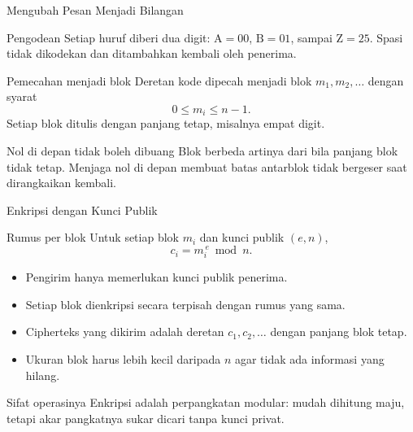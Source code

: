 \documentclass[aspectratio=169,11pt]{beamer}
\begin{document}
\begin{frame}{Mengubah Pesan Menjadi Bilangan}
    \footnotesize
    \begin{block}{Pengodean}
        Setiap huruf diberi dua digit: $\text{A}=00$, $\text{B}=01$, sampai
        $\text{Z}=25$. Spasi tidak dikodekan dan ditambahkan kembali oleh
        penerima.
    \end{block}
    \begin{block}{Pemecahan menjadi blok}
        Deretan kode dipecah menjadi blok $m_1, m_2, \dots$ dengan syarat
        \[
            0 \le m_i \le n-1 .
        \]
        Setiap blok ditulis dengan panjang tetap, misalnya empat digit.
    \end{block}
    \begin{alertblock}{Nol di depan tidak boleh dibuang}
        \footnotesize
        Blok  berbeda artinya dari  bila panjang blok
        tidak tetap. Menjaga nol di depan membuat batas antarblok tidak
        bergeser saat dirangkaikan kembali.
    \end{alertblock}
\end{frame}

\begin{frame}{Enkripsi dengan Kunci Publik}
    \footnotesize
    \begin{block}{Rumus per blok}
        Untuk setiap blok $m_i$ dan kunci publik $(e,n)$,
        \[
            c_i = m_i^{\,e} \bmod n .
        \]
    \end{block}
    \begin{itemize}
        \item Pengirim hanya memerlukan kunci publik penerima.
        \item Setiap blok dienkripsi secara terpisah dengan rumus yang sama.
        \item Cipherteks yang dikirim adalah deretan $c_1, c_2, \dots$ dengan
              panjang blok tetap.
        \item Ukuran blok harus lebih kecil daripada $n$ agar tidak ada
              informasi yang hilang.
    \end{itemize}
    \begin{exampleblock}{Sifat operasinya}
        \footnotesize
        Enkripsi adalah perpangkatan modular: mudah dihitung maju, tetapi
        akar pangkatnya sukar dicari tanpa kunci privat.
    \end{exampleblock}
\end{frame}
\end{document}

